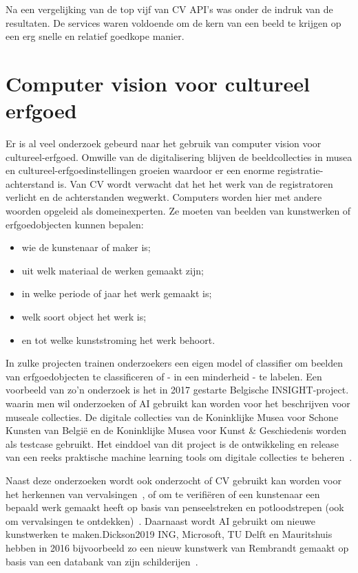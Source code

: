 Na een vergelijking van de top vijf van CV API’s was \textcite{Oberoi2016} onder de indruk van de resultaten. De services waren voldoende om de kern van een beeld te krijgen op een erg snelle en relatief goedkope manier.

\section{Computer vision voor cultureel erfgoed}
\label{sec:cv-voor-ce}

Er is al veel onderzoek gebeurd naar het gebruik van computer vision voor cultureel-erfgoed. Omwille van de digitalisering blijven de beeldcollecties in musea en cultureel-erfgoedinstellingen groeien waardoor er een enorme registratie-achterstand is.  Van CV wordt verwacht dat het het werk van de registratoren verlicht en de achterstanden wegwerkt. Computers worden hier met andere woorden opgeleid als domeinexperten. Ze moeten van beelden van kunstwerken of erfgoedobjecten kunnen bepalen:
\begin{itemize}
	\item wie de kunstenaar of maker is;
	\item uit welk materiaal de werken gemaakt zijn; 
	\item in welke periode of jaar het werk gemaakt is;
	\item welk soort object het werk is;
	\item en tot welke kunststroming het werk behoort.  
\end{itemize}


In zulke projecten trainen onderzoekers een eigen model of classifier om beelden van erfgoedobjecten te classificeren of - in een minderheid - te labelen. Een voorbeeld van zo’n onderzoek is het in 2017 gestarte Belgische INSIGHT-project. waarin men wil onderzoeken of AI gebruikt kan worden voor het beschrijven voor museale collecties. De digitale collecties van de Koninklijke Musea voor Schone Kunsten van Belgi\"{e} en de Koninklijke Musea voor Kunst \& Geschiedenis worden als testcase gebruikt. Het einddoel van dit project is de ontwikkeling en release van een reeks praktische machine learning tools om digitale collecties te beheren~\autocite{UniAntwerpen2017}.

Naast deze onderzoeken wordt ook onderzocht of CV gebruikt kan worden voor het herkennen van vervalsingen~\autocite{Dickson2018}, of om te verifi\"{e}ren of een kunstenaar een bepaald werk gemaakt heeft op basis van penseelstreken en potloodstrepen (ook om vervalsingen te ontdekken)~\autocite{Elgammal2017}. Daarnaast wordt AI gebruikt om nieuwe kunstwerken te maken.{Dickson2019} ING, Microsoft, TU Delft en Mauritshuis hebben in 2016 bijvoorbeeld zo een nieuw kunstwerk van Rembrandt gemaakt op basis van een databank van zijn schilderijen~\autocite{ING2016}.%

